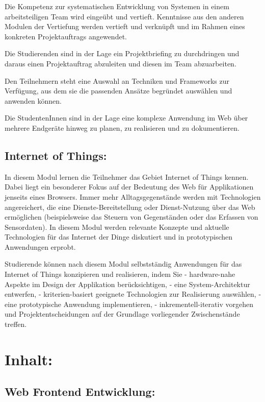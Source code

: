 Die Kompetenz zur systematischen Entwicklung von Systemen in einem
arbeitsteiligen Team wird eingeübt und vertieft. Kenntnisse aus den
anderen Modulen der Vertiefung werden vertieft und verknüpft und im
Rahmen eines konkreten Projektauftrags angewendet.

Die Studierenden sind in der Lage ein Projektbriefing zu durchdringen
und daraus einen Projektauftrag abzuleiten und diesen im Team
abzuarbeiten.

Den Teilnehmern steht eine Auswahl an Techniken und Frameworks zur
Verfügung, aus dem sie die passenden Ansätze begründet auswählen und
anwenden können.

Die StudentenInnen sind in der Lage eine komplexe Anwendung im Web über
mehrere Endgeräte hinweg zu planen, zu realisieren und zu dokumentieren.

\subsection{Internet of Things:}\label{internet-of-things}

In diesem Modul lernen die Teilnehmer das Gebiet Internet of Things
kennen. Dabei liegt ein besonderer Fokus auf der Bedeutung des Web für
Applikationen jenseits eines Browsers. Immer mehr Alltagsgegenstände
werden mit Technologien angereichert, die eine Dienste-Bereitstellung
oder Dienst-Nutzung über das Web ermöglichen (beispielsweise das Steuern
von Gegenständen oder das Erfassen von Sensordaten). In diesem Modul
werden relevante Konzepte und aktuelle Technologien für das Internet der
Dinge diskutiert und in prototypischen Anwendungen erprobt.

Studierende können nach diesem Modul selbstständig Anwendungen für das
Internet of Things konzipieren und realisieren, indem Sie -
hardware-nahe Aspekte im Design der Applikation berücksichtigen, - eine
System-Architektur entwerfen, - kriterien-basiert geeignete Technologien
zur Realisierung auswählen, - eine prototypische Anwendung
implementieren, - inkrementell-iterativ vorgehen und
Projektentscheidungen auf der Grundlage vorliegender Zwischenstände
treffen.

\section{Inhalt:}\label{inhalt-30}

\subsection{Web Frontend
Entwicklung:}\label{web-frontend-entwicklung-1}

